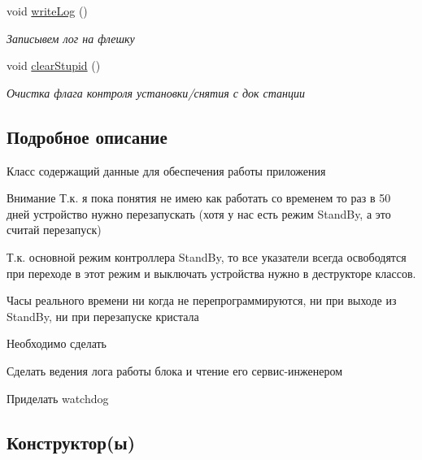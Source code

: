 \begin{DoxyCompactItemize}
void \hyperlink{classapp_1_1_t_application_a8c4bf0b62709ad4abd9c9027f1f58106}{write\+Log} ()
\begin{DoxyCompactList}\small\item\em Записывем лог на флешку \end{DoxyCompactList}\item 
void \hyperlink{classapp_1_1_t_application_aaa44a223c18f6087f10eb9bae637b90c}{clear\+Stupid} ()
\begin{DoxyCompactList}\small\item\em Очистка флага контроля установки/снятия с док станции \end{DoxyCompactList}\end{DoxyCompactItemize}


\subsection{Подробное описание}
Класс содержащий данные для обеспечения работы приложения 

\begin{DoxyAttention}{Внимание}
Т.\+к. я пока понятия не имею как работать со временем то раз в 50 дней устройство нужно перезапускать (хотя у нас есть режим Stand\+By, а это считай перезапуск) 

Т.\+к. основной режим контроллера Stand\+By, то все указатели всегда освободятся при переходе в этот режим и выключать устройства нужно в деструкторе классов. 

Часы реального времени ни когда не перепрограммируются, ни при выходе из Stand\+By, ни при перезапуске кристала 
\end{DoxyAttention}
\begin{DoxyRefDesc}{Необходимо сделать}
\item[\hyperlink{todo__todo000004}{Необходимо сделать}]Сделать ведения лога работы блока и чтение его сервис-\/инженером 

Приделать watchdog \end{DoxyRefDesc}


\subsection{Конструктор(ы)}
\mbox{\label{classapp_1_1_t_application_a5b7af31c95dab9a3f14ee792429a0737}} 
